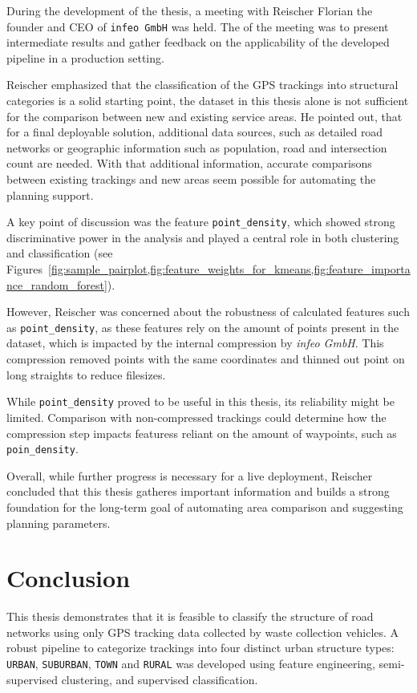 \documentclass[a4paper,12pt,twoside]{scrreprt}
\begin{document}
During the development of the thesis, a meeting with Reischer Florian the
founder and CEO of \texttt{infeo GmbH} was held.
The of the meeting was to present intermediate results and gather feedback on
the applicability of the developed pipeline in a production setting.

Reischer emphasized that the classification of the GPS trackings into
structural categories is a solid starting point, the dataset in this thesis
alone is not sufficient for the comparison between new and existing service
areas. He pointed out, that for a final deployable solution, additional data
sources, such as detailed road networks or geographic information such as
population, road and intersection count are needed.
With that additional information, accurate comparisons between existing
trackings and new areas seem possible for automating the planning support.

A key point of discussion was the feature \texttt{point\_density}, which showed
strong discriminative power in the analysis and played a central role in both
clustering and classification (see
Figures~\ref{fig:sample_pairplot,fig:feature_weights_for_kmeans,fig:feature_importance_random_forest}).

However, Reischer was concerned about the robustness of calculated features
such as \texttt{point\_density}, as these features rely on the amount of points
present in the dataset, which is impacted by the internal compression by
\textit{infeo GmbH}.
This compression removed points with the same coordinates and thinned out point
on long straights to reduce filesizes.

While \texttt{point\_density} proved to be useful in this thesis, its
reliability might be limited.
Comparison with non-compressed trackings could determine how the compression
step impacts featuress reliant on the amount of waypoints, such as
\texttt{poin\_density}.

Overall, while further progress is necessary for a live deployment, Reischer
concluded that this thesis gatheres important information and builds a strong
foundation for the long-term goal of automating area comparison and suggesting
planning parameters.

\chapter{Conclusion}

This thesis demonstrates that it is feasible to classify the structure of road
networks
using only GPS tracking data collected by waste collection vehicles.
A robust pipeline to categorize trackings into four distinct urban structure
types: \texttt{URBAN}, \texttt{SUBURBAN}, \texttt{TOWN} and \texttt{RURAL} was
developed using feature engineering, semi-supervised clustering, and supervised
classification.
\end{document}
